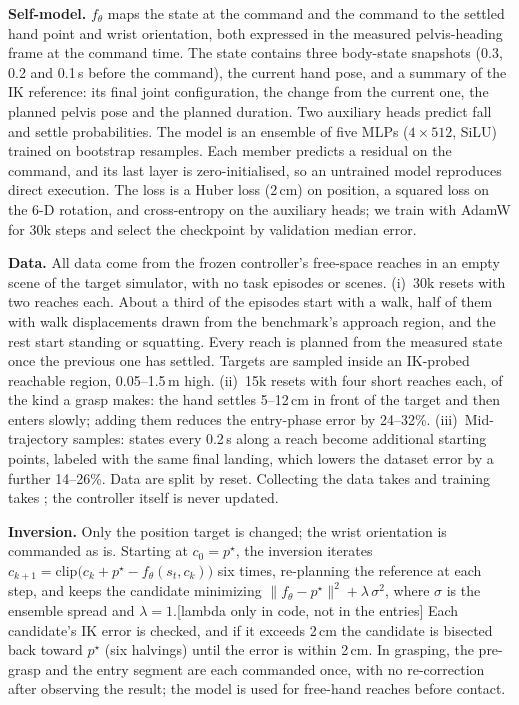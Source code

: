 \documentclass[conference]{IEEEtran}
\newif\ifdraft \drafttrue
\newcommand{\dnote}[1]{\ifdraft{\color{red}\footnotesize[#1]}\fi}
\begin{document}
\textbf{Self-model.} $f_\theta$ maps the state at the command and the command to the settled hand point and wrist orientation, both expressed in the measured pelvis-heading frame at the command time. The state contains three body-state snapshots (0.3, 0.2 and 0.1\,s before the command), the current hand pose, and a summary of the IK reference: its final joint configuration, the change from the current one, the planned pelvis pose and the planned duration. Two auxiliary heads predict fall and settle probabilities. The model is an ensemble of five MLPs ($4\times512$, SiLU) trained on bootstrap resamples. Each member predicts a residual on the command, and its last layer is zero-initialised, so an untrained model reproduces direct execution. The loss is a Huber loss (2\,cm) on position, a squared loss on the 6-D rotation, and cross-entropy on the auxiliary heads; we train with AdamW for 30k steps and select the checkpoint by validation median error.

\textbf{Data.} All data come from the frozen controller's free-space reaches in an empty scene of the target simulator, with no task episodes or scenes. (i)~30k resets with two reaches each. About a third of the episodes start with a walk, half of them with walk displacements drawn from the benchmark's approach region, and the rest start standing or squatting. Every reach is planned from the measured state once the previous one has settled. Targets are sampled inside an IK-probed reachable region, 0.05--1.5\,m high. (ii)~15k resets with four short reaches each, of the kind a grasp makes: the hand settles 5--12\,cm in front of the target and then enters slowly; adding them reduces the entry-phase error by 24--32\%. (iii)~Mid-trajectory samples: states every 0.2\,s along a reach become additional starting points, labeled with the same final landing, which lowers the dataset error by a further 14--26\%. Data are split by reset. Collecting the data takes  and training takes ; the controller itself is never updated.

\textbf{Inversion.} Only the position target is changed; the wrist orientation is commanded as is. Starting at $c_0=p^\star$, the inversion iterates $c_{k+1}=\mathrm{clip}\big(c_k+p^\star-f_\theta(s_t,c_k)\big)$ six times, re-planning the reference at each step, and keeps the candidate minimizing $\lVert f_\theta-p^\star\rVert^2+\lambda\,\sigma^2$, where $\sigma$ is the ensemble spread and $\lambda=1$.\dnote{lambda only in code, not in the entries}
Each candidate's IK error is checked, and if it exceeds 2\,cm the candidate is bisected back toward $p^\star$ (six halvings) until the error is within 2\,cm. In grasping, the pre-grasp and the entry segment are each commanded once, with no re-correction after observing the result; the model is used for free-hand reaches before contact.
\end{document}

